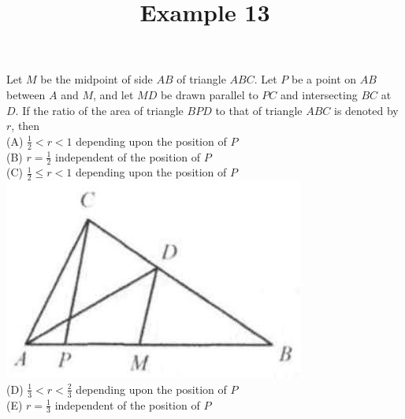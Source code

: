 \documentclass{article}
\title{Example 13}
\date{}
\begin{document}
\maketitle

Let \(M\) be the midpoint of side \(A B\) of triangle \(A B C\). Let \(P\) be a point on \(A B\) between \(A\) and \(M\), and let \(M D\) be drawn parallel to \(P C\) and intersecting \(B C\) at \(D\). If the ratio of the area of triangle \(B P D\) to that of triangle \(A B C\) is denoted by \(r\), then\\
(A) \(\frac{1}{2}<r<1\) depending upon the position of \(P\)\\
(B) \(r=\frac{1}{2}\) independent of the position of \(P\)\\
(C) \(\frac{1}{2} \leq r<1\) depending upon the position of \(P\)\\
\centering
\includegraphics[width=\textwidth]{images/problem_image_1.jpg}\\
(D) \(\frac{1}{3}<r<\frac{2}{3}\) depending upon the position of \(P\)\\
(E) \(r=\frac{1}{3}\) independent of the position of \(P\)
\end{document}

